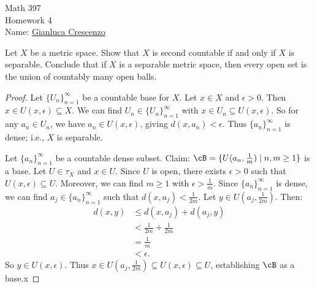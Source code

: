 \documentclass[11pt,twoside,openany]{memoir}
\begin{document}
\begin{center}
{\large Math 397 \\[0.1in]Homework 4 \\[0.1in]}
{Name:} {\underline{Gianluca Crescenzo\hspace*{2in}}}\\[0.15in]
\end{center}
\vspace{4pt}
    \begin{exercise}
        Let $X$ be a metric space. Show that $X$ is second countable if and only if $X$ is separable. Conclude that if $X$ is a separable metric space, then every open set is the union of countably many open balls.
    \end{exercise}
        {\color{red} \begin{proof}
            Let $\{U_n\}_{n = 1}^\infty$ be a countable base for $X$. Let $x \in X$ and $\epsilon > 0$. Then $x \in U(x,\epsilon) \subseteq X$. We can find $U_n \in \{U_n\}_{n = 1}^\infty$ with $x \in U_n \subseteq U(x,\epsilon)$. So for any $a_n \in U_n$, we have $a_n \in U(x,\epsilon)$, giving $d(x,a_n) < \epsilon$. Thus $\{a_n\}_{n = 1}^\infty$ is dense; i.e., $X$ is separable.

            Let $\{a_n\}_{n = 1}^\infty$ be a countable dense subset. Claim: $\cB = \{U(a_n,\frac{1}{m}) \mid n,m \geq 1\}$ is a base. Let $U \in \tau_X$ and $x \in U$. Since $U$ is open, there exists $\epsilon > 0$ such that $U(x,\epsilon) \subseteq U$. Moreover, we can find $m \geq 1$ with $\epsilon > \frac{1}{m}$. Since $\{a_n\}_{n = 1}^\infty$ is dense, we can find $a_j \in \{a_n\}_{n = 1}^\infty$ such that $d(x,a_j) < \frac{1}{2m}$. Let $y \in U(a_j,\frac{1}{2m})$. Then:
                \begin{equation*}
                \begin{split}
                    d(x,y)
                    & \leq d(x,a_j) + d(a_j,y) \\
                    & < \frac{1}{2m} + \frac{1}{2m} \\
                    & = \frac{1}{m} \\
                    & < \epsilon.
                \end{split}
                \end{equation*}
            So $y \in U(x,\epsilon)$. Thus $x \in U(a_j,\frac{1}{2m}) \subseteq U(x,\epsilon) \subseteq U$, establishing $\cB$ as a base.x
        \end{proof}}
\end{document}
